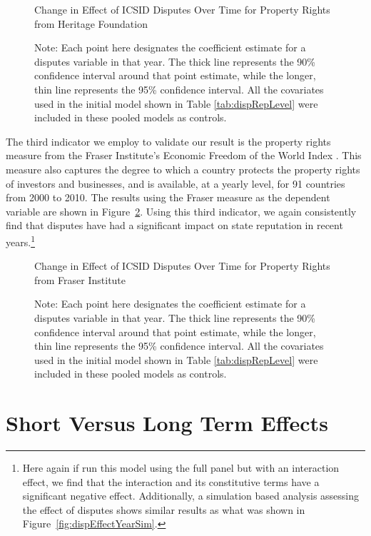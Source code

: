 \documentclass[12pt,onesided]{amsart}
\begin{document}
\begin{figure}[ht]
	\centering
	\caption{Change in Effect of ICSID Disputes Over Time for Property Rights from Heritage Foundation}
	\label{fig:dispEffectYear_herit}
	\resizebox{1\textwidth}{!}{}
	\caption*{Note: Each point here designates the coefficient estimate for a disputes variable in that year. The thick line represents the 90\% confidence interval around that point estimate, while the longer, thin line represents the 95\% confidence interval. All the covariates used in the initial model shown in Table \ref{tab:dispRepLevel} were included in these pooled models as controls.}
\end{figure}
\FloatBarrier

The third indicator we employ to validate our result is the property rights measure from the Fraser Institute's Economic Freedom of the World Index \citep{gwartney:lawson:2004}. This measure also captures the degree to which a country protects the property rights of investors and businesses, and is available, at a yearly level, for 91 countries from 2000 to 2010. The results using the Fraser measure as the dependent variable are shown in Figure~\ref{fig:dispEffectYear_fraser}. Using this third indicator, we again consistently find that disputes have had a significant impact on state reputation in recent years.\footnote{Here again if run this model using the full panel but with an interaction effect, we find that the interaction and its constitutive terms have a significant negative effect. Additionally, a simulation based analysis assessing the effect of disputes shows similar results as what was shown in Figure~\ref{fig:dispEffectYearSim}.} 

\begin{figure}[ht]
	\centering
	\caption{Change in Effect of ICSID Disputes Over Time for Property Rights from Fraser Institute}
	\label{fig:dispEffectYear_fraser}
	\resizebox{1\textwidth}{!}{}
	\caption*{Note: Each point here designates the coefficient estimate for a disputes variable in that year. The thick line represents the 90\% confidence interval around that point estimate, while the longer, thin line represents the 95\% confidence interval. All the covariates used in the initial model shown in Table \ref{tab:dispRepLevel} were included in these pooled models as controls.}
\end{figure}
\FloatBarrier

\section*{Short Versus Long Term Effects}
\end{document}

